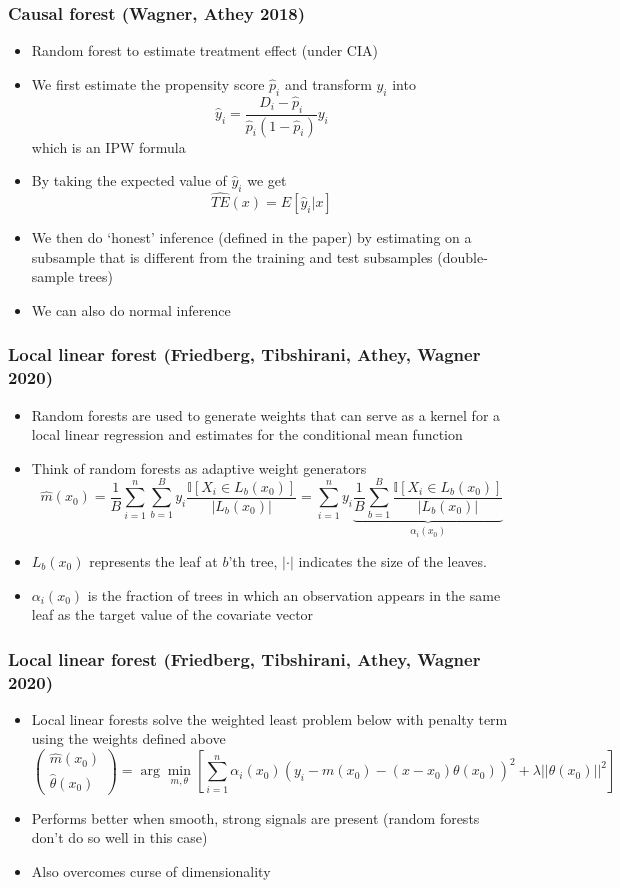 \documentclass[aspectratio=169]{beamer}
\begin{document}
\begin{frame}
\frametitle{Causal forest (Wagner, Athey 2018)}
\begin{itemize}
\item Random forest to estimate treatment effect (under CIA)
\item We first estimate the propensity score $\hat{p}_i$ and transform $y_i$ into
\[
\hat{y}_i = \frac{D_i-\hat{p}_i}{\hat{p}_i(1-\hat{p}_i)}y_i
\]
which is an IPW formula
\item By taking the expected value of $\hat{y}_i$ we get
\[
\widehat{TE}(x)=E[\hat{y}_i|x]
\]
\item We then do `honest' inference (defined in the paper) by estimating on a subsample that is different from the training and test subsamples (double-sample trees)
\item We can also do normal inference
\end{itemize}
\end{frame}

\begin{frame}
\frametitle{Local linear forest (Friedberg, Tibshirani, Athey, Wagner 2020)}
\begin{itemize}
\item Random forests are used to generate weights that can serve as a kernel for a local linear regression and estimates for the conditional mean function
\item Think of random forests as adaptive weight generators
\[
\hat{m}(x_0)=\frac{1}{B}\sum_{i=1}^n \sum_{b=1}^By_i \frac{\mathbb{I}[X_i\in L_b(x_0)]}{|L_b(x_0)|}=\sum_{i=1}^n y_i \underbrace{\frac{1}{B}\sum_{b=1}^B\frac{\mathbb{I}[X_i\in L_b(x_0)]}{|L_b(x_0)|}}_{\alpha_i(x_0)}
\]
\item $L_b(x_0)$ represents the leaf at $b$'th tree, $|\cdot|$ indicates the size of the leaves. 
\item $\alpha_i(x_0)$ is the fraction of trees in which an observation appears in the same leaf as the target value of the covariate vector
\end{itemize}
\end{frame}

\begin{frame}
\frametitle{Local linear forest (Friedberg, Tibshirani, Athey, Wagner 2020)}
\begin{itemize}
\item Local linear forests solve the weighted least problem below with penalty term using the weights defined above
\[
\begin{pmatrix} \hat{m}(x_0) \\ \hat{\theta}(x_0) \end{pmatrix} = \arg\min_{m,\theta}\left[ \sum_{i=1}^n \alpha_i(x_0) (y_i-m(x_0)-(x-x_0)\theta(x_0))^2 +\lambda ||\theta(x_0)||^2\right]
\]
\item Performs better when smooth, strong signals are present (random forests don't do so well in this case)
\item Also overcomes curse of dimensionality
\end{itemize}
\end{frame}
\end{document}
